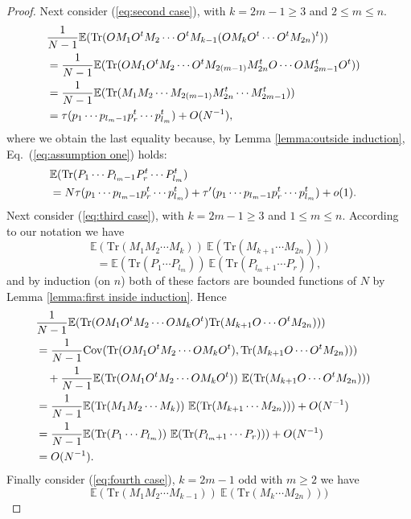 \documentclass[10pt,a4paper]{amsart}
\newcommand{\Tr}{\mathrm{Tr}}
\newcommand{\cov}{\mathrm{Cov}}
\newcommand{\rE} {\mathbb{E}}
\begin{document}
\begin{proof}
Next consider (\ref{eq:second case}), with $k = 2m - 1 \geq 3$ and $2 \leq m \leq n$.
\begin{align*} \lefteqn{
\frac{1}{N - 1}\rE( \Tr(O M_1 O^t M_2 \cdots O^t M_{k-1} (O M_{k} O^t \cdots O^t M_{2n})^t ))} \\
& \mbox{} =
\frac{1}{N - 1}\rE( \Tr(O M_1 O^t M_2 \cdots O^t M_{2(m-1)} M_{2n}^t O \cdots O M_{2m-1}^t O^t)) \\
& \mbox{} =
\frac{1}{N - 1}\rE( \Tr(M_1 M_2 \cdots M_{2(m-1)} M_{2n}^t  \cdots  M_{2m-1}^t)) \\
& \mbox{} =
\tau(p_1 \cdots p_{l_m-1} p_r^t \cdots p_{l_m}^t ) + O(N^{-1}),
\end{align*}
where we obtain the last equality because, by Lemma
\ref{lemma:outside induction}, Eq.~(\ref{eq:assumption one})
holds:
\begin{align*}\lefteqn{
\rE(\Tr(P_1 \cdots P_{l_m-1} P_r^t \cdots P_{l_m}^t ) } \\
& =
N \tau(p_1 \cdots p_{l_m-1} p_r^t \cdots p_{l_m}^t )
+ 
\tau'(p_1 \cdots p_{l_m-1} p_r^t \cdots p_{l_m}^t )
+
o(1).
\end{align*}
Next consider (\ref{eq:third case}), with $k = 2m - 1 \geq
3$ and $1 \leq m \leq n$.  According to our notation we have
\[
\rE(\Tr(M_1 M_2 \cdots M_{k}))\ \rE(\Tr(M_{k+1}  \cdots  M_{2n}) ))
\]
\[
=
\rE(\Tr( P_1 \cdots P_{l_m}))\ \rE(\Tr( P_{l_m +1} \cdots P_{r})),
\]
and by induction (on $n$) both of these factors are bounded
functions of $N$ by Lemma \ref{lemma:first inside
  induction}. Hence
\begin{align*}\lefteqn{
\frac{1}{N - 1}
\rE( \Tr(O M_1 O^t M_2 \cdots O M_{k}O^t) \Tr(M_{k+1} O \cdots O^t M_{2n}) ))} \\
& =
\frac{1}{N - 1} \cov(\Tr(O M_1 O^t M_2 \cdots O M_{k}O^t), 
                     \Tr(M_{k+1} O \cdots O^t M_{2n}) )) \\
& \quad+
\frac{1}{N - 1} \rE(\Tr(O M_1 O^t M_2 \cdots O M_{k}O^t)) \
                 \rE(\Tr(M_{k+1} O \cdots O^t M_{2n}) )) \\
& =
\frac{1}{N - 1} \rE(\Tr(M_1 M_2 \cdots M_{k})) \
                 \rE(\Tr(M_{k+1}  \cdots  M_{2n}) )) + O(N^{-1}) \\
&=
                 \frac{1}{N - 1} \rE(\Tr(P_1 \cdots P_{l_m})) \
                 \rE(\Tr(P_{l_m+1}  \cdots  P_{r}) )) + O(N^{-1}) \\
& = O(N^{-1}).
\end{align*}
Finally consider (\ref{eq:fourth case}), $k = 2m - 1$ odd
with $m \geq 2$ we have
\[
\rE(\Tr(M_1 M_2 \cdots M_{k-1}))\ \rE(\Tr(M_{k}  \cdots  M_{2n}) ))
\]
\end{proof}
\end{document}

